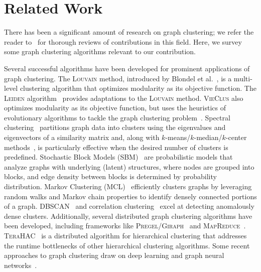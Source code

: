 \section{Related Work}
\label{subsec:related_work}
There has been a significant amount of research on graph clustering; we refer the reader to~\cite{FORTUNATO201075,HamannMapEq,watteau2024advancedgraphclusteringmethods} for thorough reviews of contributions in this field. Here, we survey some graph clustering algorithms relevant to our contribution. 

Several successful algorithms have been developed for prominent applications of graph clustering. The \textsc{Louvain} method, introduced by Blondel et al.~\cite{louvain}, is a multi-level clustering algorithm that optimizes modularity as its objective function. The \textsc{Leiden} algorithm~\cite{Traag2019} provides adaptations to the \textsc{Louvain} method. \textsc{VieClus} also optimizes modularity as its objective function, but uses the heuristics of evolutionary algorithms to tackle the graph clustering problem~\cite{vieclus}.     
Spectral clustering~\cite{vonLuxburg2007} partitions graph data into clusters using the eigenvalues and eigenvectors of a similarity matrix and, along with $k$-means/$k$-median/$k$-center methods~\cite{JIANG2023691,wanclust2017}, is particularly effective when the desired number of clusters is predefined. Stochastic Block Models (SBM)~\cite{JIANG2023691,Lee2019} are probabilistic models that analyze graphs with underlying (latent) structures, where nodes are grouped into blocks, and edge density between blocks is determined by probability distribution. Markov Clustering (MCL)~\cite{dongen2008} efficiently clusters graphs by leveraging random walks and Markov chain properties to identify densely connected portions of a graph. \textsc{DBSCAN}~\cite{apachegiraph} and correlation clustering~\cite{Bansal2004} excel at detecting anomalously dense clusters. 
Additionally, several distributed graph clustering algorithms have been developed, including frameworks like \textsc{Pregel}/\textsc{Giraph}~\cite{pregel,apachegiraph} and \textsc{MapReduce}~\cite{mapreduce}. \textsc{TeraHAC}~\cite{terahac} is a distributed algorithm for hierarchical clustering that addresses the runtime bottlenecks of other hierarchical clustering algorithms. Some recent approaches to graph clustering draw on deep learning and graph neural networks~\cite{ijcai2020p693,liu2023surveydeepgraphclustering,su2024surveydeeplearningcommunity,wangdeepgraphnodeclust2024}.

